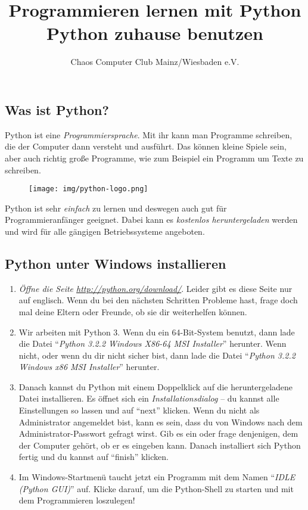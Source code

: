 



	\title{Programmieren lernen mit Python\\Python zuhause benutzen}
	\author{Chaos Computer Club Mainz/Wiesbaden e.V.}
	\maketitle
	
	\subsection*{Was ist Python?}
	Python ist eine \emph{Programmiersprache}. Mit ihr kann man Programme schreiben, die der Computer dann versteht und ausführt. Das können kleine Spiele sein, aber auch richtig große Programme, wie zum Beispiel ein Programm um Texte zu schreiben.
	
	\begin{figure}[htbp]
		\centering
		\texttt{[image: img/python-logo.png]}
	\end{figure}
	
	Python ist sehr \emph{einfach} zu lernen und deswegen auch gut für Programmieranfänger geeignet. Dabei kann es \emph{kostenlos heruntergeladen} werden und wird für alle gängigen Betriebssysteme angeboten.
	
	\subsection*{Python unter Windows installieren}
	\begin{enumerate}
		\item \emph{Öffne die Seite \url{http://python.org/download/}}. Leider gibt es diese Seite nur auf englisch. Wenn du bei den nächsten Schritten Probleme hast, frage doch mal deine Eltern oder Freunde, ob sie dir weiterhelfen können.
		
		\item Wir arbeiten mit Python 3. Wenn du ein 64-Bit-System benutzt, dann lade die Datei \enquote{\emph{Python 3.2.2 Windows X86-64 MSI Installer}} herunter. Wenn nicht, oder wenn du dir nicht sicher bist, dann lade die Datei \enquote{\emph{Python 3.2.2 Windows x86 MSI Installer}} herunter.
		
		\item Danach kannst du Python mit einem Doppelklick auf die heruntergeladene Datei installieren. Es öffnet sich ein \emph{Installationsdialog} – du kannst alle Einstellungen so lassen und auf \enquote{next} klicken. Wenn du nicht als Administrator angemeldet bist, kann es sein, dass du von Windows nach dem Administrator-Passwort gefragt wirst. Gib es ein oder frage denjenigen, dem der Computer gehört, ob er es eingeben kann. Danach installiert sich Python fertig und du kannst auf \enquote{finish} klicken.
		
		\item Im Windows-Startmenü taucht jetzt ein Programm mit dem Namen \enquote{\emph{IDLE (Python GUI)}} auf. Klicke darauf, um die Python-Shell zu starten und mit dem Programmieren loszulegen!
	\end{enumerate}
	
